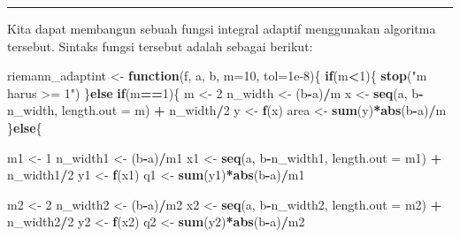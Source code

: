 \documentclass[]{book}
\newenvironment{Shaded}{\begin{snugshade}}{\end{snugshade}}
\newcommand{\ControlFlowTok}[1]{\textcolor[rgb]{0.13,0.29,0.53}{\textbf{#1}}}
\newcommand{\DataTypeTok}[1]{\textcolor[rgb]{0.13,0.29,0.53}{#1}}
\newcommand{\DecValTok}[1]{\textcolor[rgb]{0.00,0.00,0.81}{#1}}
\newcommand{\FloatTok}[1]{\textcolor[rgb]{0.00,0.00,0.81}{#1}}
\newcommand{\KeywordTok}[1]{\textcolor[rgb]{0.13,0.29,0.53}{\textbf{#1}}}
\newcommand{\NormalTok}[1]{#1}
\newcommand{\OperatorTok}[1]{\textcolor[rgb]{0.81,0.36,0.00}{\textbf{#1}}}
\newcommand{\StringTok}[1]{\textcolor[rgb]{0.31,0.60,0.02}{#1}}
\theoremstyle{definition}
\theoremstyle{definition}
\theoremstyle{definition}
\theoremstyle{remark}
\begin{document}
\begin{center}\rule{0.5\linewidth}{\linethickness}\end{center}

Kita dapat membangun sebuah fungsi integral adaptif menggunakan algoritma tersebut. Sintaks fungsi tersebut adalah sebagai berikut:

\begin{Shaded}
\begin{Highlighting}[]
\NormalTok{riemann_adaptint <-}\StringTok{ }\ControlFlowTok{function}\NormalTok{(f, a, b, }\DataTypeTok{m=}\DecValTok{10}\NormalTok{, }\DataTypeTok{tol=}\FloatTok{1e-8}\NormalTok{)\{}
  \ControlFlowTok{if}\NormalTok{(m}\OperatorTok{<}\DecValTok{1}\NormalTok{)\{}
    \KeywordTok{stop}\NormalTok{(}\StringTok{"m harus >= 1"}\NormalTok{)}
\NormalTok{  \}}\ControlFlowTok{else} \ControlFlowTok{if}\NormalTok{(m}\OperatorTok{==}\DecValTok{1}\NormalTok{)\{}
\NormalTok{    m <-}\StringTok{ }\DecValTok{2}
\NormalTok{    n_width <-}\StringTok{ }\NormalTok{(b}\OperatorTok{-}\NormalTok{a)}\OperatorTok{/}\NormalTok{m}
\NormalTok{    x <-}\StringTok{ }\KeywordTok{seq}\NormalTok{(a, b}\OperatorTok{-}\NormalTok{n_width, }\DataTypeTok{length.out =}\NormalTok{ m) }\OperatorTok{+}\StringTok{ }\NormalTok{n_width}\OperatorTok{/}\DecValTok{2}
\NormalTok{    y <-}\StringTok{ }\KeywordTok{f}\NormalTok{(x)}
\NormalTok{    area <-}\StringTok{ }\KeywordTok{sum}\NormalTok{(y)}\OperatorTok{*}\KeywordTok{abs}\NormalTok{(b}\OperatorTok{-}\NormalTok{a)}\OperatorTok{/}\NormalTok{m}
\NormalTok{  \}}\ControlFlowTok{else}\NormalTok{\{}
    
\NormalTok{    m1 <-}\StringTok{ }\DecValTok{1}
\NormalTok{    n_width1 <-}\StringTok{ }\NormalTok{(b}\OperatorTok{-}\NormalTok{a)}\OperatorTok{/}\NormalTok{m1}
\NormalTok{    x1 <-}\StringTok{ }\KeywordTok{seq}\NormalTok{(a, b}\OperatorTok{-}\NormalTok{n_width1, }\DataTypeTok{length.out =}\NormalTok{ m1) }\OperatorTok{+}\StringTok{ }\NormalTok{n_width1}\OperatorTok{/}\DecValTok{2}
\NormalTok{    y1 <-}\StringTok{ }\KeywordTok{f}\NormalTok{(x1)}
\NormalTok{    q1 <-}\StringTok{ }\KeywordTok{sum}\NormalTok{(y1)}\OperatorTok{*}\KeywordTok{abs}\NormalTok{(b}\OperatorTok{-}\NormalTok{a)}\OperatorTok{/}\NormalTok{m1}
    
\NormalTok{    m2 <-}\StringTok{ }\DecValTok{2}
\NormalTok{    n_width2 <-}\StringTok{ }\NormalTok{(b}\OperatorTok{-}\NormalTok{a)}\OperatorTok{/}\NormalTok{m2}
\NormalTok{    x2 <-}\StringTok{ }\KeywordTok{seq}\NormalTok{(a, b}\OperatorTok{-}\NormalTok{n_width2, }\DataTypeTok{length.out =}\NormalTok{ m2) }\OperatorTok{+}\StringTok{ }\NormalTok{n_width2}\OperatorTok{/}\DecValTok{2}
\NormalTok{    y2 <-}\StringTok{ }\KeywordTok{f}\NormalTok{(x2)}
\NormalTok{    q2 <-}\StringTok{ }\KeywordTok{sum}\NormalTok{(y2)}\OperatorTok{*}\KeywordTok{abs}\NormalTok{(b}\OperatorTok{-}\NormalTok{a)}\OperatorTok{/}\NormalTok{m2}
    

\end{Highlighting}
\end{Shaded}
\end{document}
